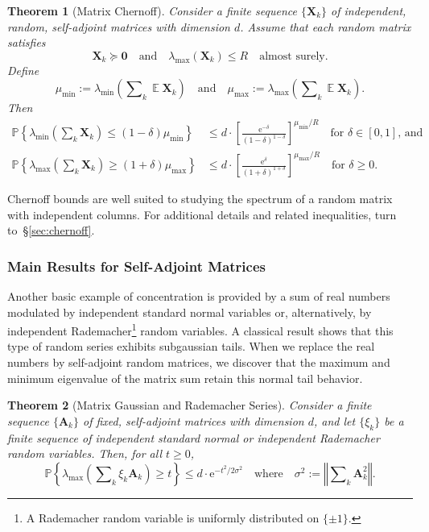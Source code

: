 \documentclass[11pt,letterpaper,twoside,reqno,draft]{amsart}
\newtheorem{thm}{Theorem}
\theoremstyle{remark}
\numberwithin{equation}{section}
\numberwithin{thm}{section}
\begin{document}
\begin{thm}[Matrix Chernoff]
Consider a finite sequence $\{ {\bm{{X}}}_k \}$ of independent, random, self-adjoint matrices with dimension $d$.  Assume that each random matrix satisfies
$$
{\bm{{X}}}_k {\succcurlyeq} {\bm{{0}}}
\quad\text{and}\quad
\lambda_{\max}( {\bm{{X}}}_k ) \leq R
\quad\text{almost surely}.
$$
Define
$$
\mu_{\min} := \lambda_{\min}\left( \sum\nolimits_k {\operatorname{\mathbb{E}}} {\bm{{X}}}_k \right)
\quad\text{and}\quad
\mu_{\max} := \lambda_{\max}\left( \sum\nolimits_k {\operatorname{\mathbb{E}}} {\bm{{X}}}_k \right).
$$
Then
\begin{align*}
{\mathbb{P}\left\{ {{ \lambda_{\min}\left( \sum\nolimits_k {\bm{{X}}}_k \right) \leq (1 - \delta) \mu_{\min} }} \right\}}
	&\leq d \cdot \left[ \frac{{\mathrm{e}}^{-\delta}}{(1-\delta)^{1 - \delta}} \right]^{\mu_{\min}/R}
	\quad\text{for $\delta \in [0, 1]$, and} \\
{\mathbb{P}\left\{ {{ \lambda_{\max}\left( \sum\nolimits_k {\bm{{X}}}_k \right) \geq (1 + \delta) \mu_{\max} }} \right\}}
	&\leq d \cdot \left[ \frac{{\mathrm{e}}^{\delta}}{(1+\delta)^{1 + \delta}} \right]^{\mu_{\max}/R}
	\quad\text{for $\delta \geq 0$.}
\end{align*}
\end{thm}

Chernoff bounds are well suited to studying the spectrum of a random matrix with independent columns.  For additional details and related inequalities, turn to~\S\ref{sec:chernoff}.

\subsubsection{Main Results for Self-Adjoint Matrices}

Another basic example of concentration is provided by a sum of real numbers modulated by independent standard normal variables or, alternatively, by independent Rademacher\footnote{A Rademacher random variable is uniformly distributed on $\{\pm 1\}$.}
random variables.  A classical result 
shows that this type of random series exhibits subgaussian tails.  When we replace the real numbers by self-adjoint random matrices, we discover that the maximum and minimum eigenvalue of the matrix sum retain this normal tail behavior.

\begin{thm}[Matrix Gaussian and Rademacher Series] \label{thm:intro-gauss}
Consider a finite sequence $\{ {\bm{{A}}}_k \}$ of fixed, self-adjoint matrices with dimension $d$, and let $\{ \xi_k \}$ be a finite sequence of independent standard normal or independent Rademacher random variables.  Then, for all $t \geq 0$,
$$
{\mathbb{P}\left\{ {{ \lambda_{\max}\left( \sum\nolimits_k \xi_k {\bm{{A}}}_k \right) \geq t }} \right\}}
	\leq d \cdot {\mathrm{e}}^{-t^2/2\sigma^2}
	\quad\text{where}\quad
	\sigma^2 := {\left\Vert {{ \sum\nolimits_k {\bm{{A}}}_k^2 }} \right\Vert}.
$$
\end{thm}
\end{document}
